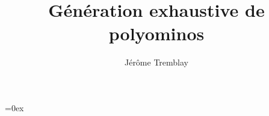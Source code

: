 \documentclass[11pt,twoside]{memoireuqam1.3}
\begin{document}
\title{G\'en\'eration exhaustive de polyominos}
\author{J\'er\^ome Tremblay} %
\uqammemoire

\thispagestyle{empty}        %
\maketitle


\renewcommand \listfigurename{LISTE DES FIGURES}
\renewcommand \appendixname{APPENDICE}
\renewcommand \figurename{Figure}
\renewcommand \tablename{Tableau}

\addtocounter{page}{1} %



\tableofcontents %
\listoffigures %
\listoftables %




\parindent=0ex %




 


%





%
\end{document}
